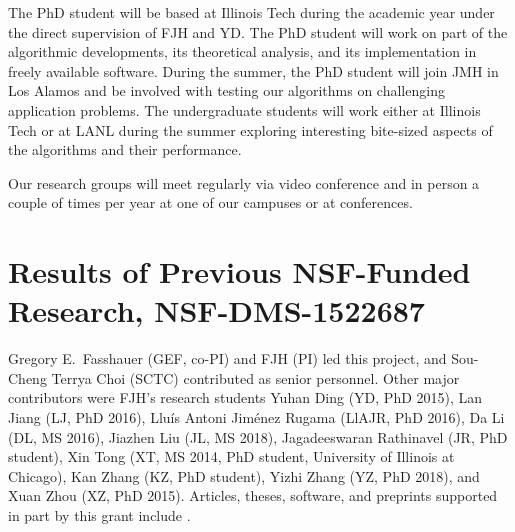 \documentclass[11pt]{NSFamsart}
\begin{document}
The PhD student will be based at Illinois Tech during the academic year under the direct supervision of FJH and YD.  The PhD student will work on part of the algorithmic developments, its theoretical analysis, and its implementation in freely available software.  During the summer, the PhD student will join JMH in Los Alamos and be involved with testing our algorithms on challenging application problems.  The undergraduate students will work either at Illinois Tech or at LANL during the summer exploring interesting bite-sized aspects of the algorithms and their performance.

Our research groups will meet regularly via video conference and in person a couple of times per year at one of our campuses or at conferences.


\section{Results of Previous NSF-Funded Research,
NSF-DMS-1522687
} \label{sec:Previous}

Gregory E.\ Fasshauer (GEF, co-PI) and FJH (PI) led this project, and Sou-Cheng Terrya Choi (SCTC) contributed as senior personnel.  Other major contributors were FJH's research students Yuhan Ding (YD, PhD 2015), Lan Jiang (LJ, PhD 2016), 
Llu\'is Antoni Jim\'enez Rugama (LlAJR, PhD 2016), Da Li (DL, MS 2016), Jiazhen Liu (JL, MS 2018), Jagadeeswaran Rathinavel (JR, 
PhD student), Xin Tong (XT, MS 2014, PhD student, University of Illinois at Chicago), Kan Zhang (KZ, PhD student), Yizhi Zhang (YZ, PhD 2018), and Xuan Zhou (XZ, PhD 2015).  Articles, theses,  
software, and preprints supported in 
part by this 
grant 
include 
\cite{ala_augmented_2017, 
	ChoEtal17a,
	ChoEtal17b,
	Din15a, 
	DinHic20a,
	GilEtal16a,
	Hic17a,
	HicJag18b,
	HicJim16a,
	HicEtal18a,
	HicEtal17a,
	HicKriWoz19a,
	RatHic19a,
	GilJim16b,
	JimHic16a,
	JohFasHic18a,
	Li16a,
	Liu17a,
	MarEtal18a,
	mccourt_stable_2017,
	MCCEtal19a,
	mishra_hybrid_2018,
	MisEtal19a,
	rashidinia_stable_2016,
	rashidinia_stable_2018,
	Zha18a,
	Zha17a,
	Zho15a,
	ZhoHic15a}.

\end{document}
